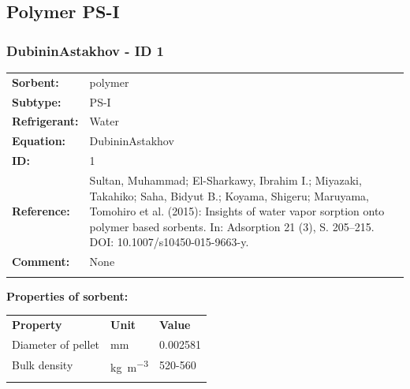\subsection{Polymer PS-I}
%
\subsubsection{DubininAstakhov - ID 1}
%
\begin{tabular}[l]{|lp{11.5cm}|}
\hline
\addlinespace

\textbf{Sorbent:} & polymer \\
\textbf{Subtype:} & PS-I \\
\textbf{Refrigerant:} & Water \\
\textbf{Equation:} & DubininAstakhov \\
\textbf{ID:} & 1 \\
\textbf{Reference:} & Sultan, Muhammad; El-Sharkawy, Ibrahim I.; Miyazaki, Takahiko; Saha, Bidyut B.; Koyama, Shigeru; Maruyama, Tomohiro et al. (2015): Insights of water vapor sorption onto polymer based sorbents. In: Adsorption 21 (3), S. 205–215. DOI: 10.1007/s10450-015-9663-y. \\
\textbf{Comment:} & None \\

\addlinespace
\hline
\end{tabular}
\newline

\textbf{Properties of sorbent:}
\newline
%
\begin{longtable}[l]{lll}
\toprule
\addlinespace
\textbf{Property} & \textbf{Unit} & \textbf{Value} \\
\addlinespace
\midrule
\endhead
\bottomrule
\endfoot
\bottomrule
\endlastfoot
\addlinespace

Diameter of pellet & \si{\milli\meter} & 0.002581\\
Bulk density & \si{\kilogram\per\cubic\meter} & 520-560\\

\addlinespace\end{longtable}

